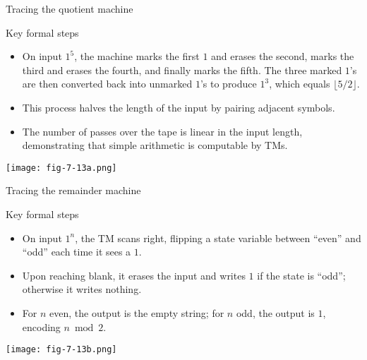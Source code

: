 \begin{frame}[t]{Tracing the quotient machine}
  \begin{tblock}{Key formal steps}
    \begin{itemize}
      \item On input $1^5$, the machine marks the first $1$ and erases
        the second, marks the third and erases the fourth, and finally
        marks the fifth.  The three marked $1$’s are then converted
        back into unmarked $1$’s to produce $1^3$, which equals
        $\lfloor 5/2 \rfloor$.
      \item This process halves the length of the input by pairing
        adjacent symbols.
      \item The number of passes over the tape is linear in the input
        length, demonstrating that simple arithmetic is computable by
        TMs.
    \end{itemize}
  \end{tblock}
  \centering
  \texttt{[image: fig-7-13a.png]} %
  \label{fr:7.3-07}
\end{frame}

\begin{frame}[t]{Tracing the remainder machine}
  \begin{tblock}{Key formal steps}
    \begin{itemize}
      \item On input $1^n$, the TM scans right, flipping a state
        variable between “even” and “odd” each time it sees a $1$.
      \item Upon reaching blank, it erases the input and writes $1$ if
        the state is “odd”; otherwise it writes nothing.
      \item For $n$ even, the output is the empty string; for $n$ odd,
        the output is $1$, encoding $n \bmod 2$.
    \end{itemize}
  \end{tblock}
  \centering
  \texttt{[image: fig-7-13b.png]} %
  \label{fr:7.3-08}
\end{frame}

